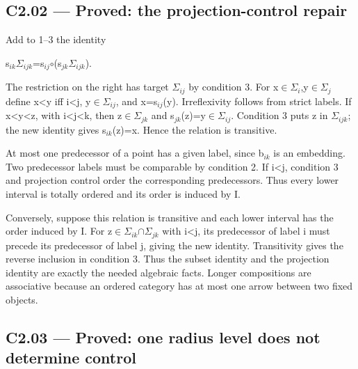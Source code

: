 \subsection{C2.02 --- Proved: the projection-control repair}\label{c2.02-proved-the-projection-control-repair}

Add to 1--3 the identity

s\ensuremath{{}_{ik}}\textbar \ensuremath{\Sigma}\ensuremath{{}_{ijk}}=s\ensuremath{{}_{ij}}\ensuremath{\circ}(s\ensuremath{{}_{jk}}\textbar \ensuremath{\Sigma}\ensuremath{{}_{ijk}}).

The restriction on the right has target \ensuremath{\Sigma}\ensuremath{{}_{ij}} by condition 3. For x\ensuremath{\in}\ensuremath{\Sigma}\ensuremath{{}_{i}},y\ensuremath{\in}\ensuremath{\Sigma}\ensuremath{{}_{j}} define x\textless y iff i\textless j, y\ensuremath{\in}\ensuremath{\Sigma}\ensuremath{{}_{ij}}, and x=s\ensuremath{{}_{ij}}(y). Irreflexivity follows from strict labels. If x\textless y\textless z, with i\textless j\textless k, then z\ensuremath{\in}\ensuremath{\Sigma}\ensuremath{{}_{jk}} and s\ensuremath{{}_{jk}}(z)=y\ensuremath{\in}\ensuremath{\Sigma}\ensuremath{{}_{ij}}. Condition 3 puts z in \ensuremath{\Sigma}\ensuremath{{}_{ijk}}; the new identity gives s\ensuremath{{}_{ik}}(z)=x. Hence the relation is transitive.

At most one predecessor of a point has a given label, since b\ensuremath{{}_{ik}} is an embedding. Two predecessor labels must be comparable by condition 2. If i\textless j, condition 3 and projection control order the corresponding predecessors. Thus every lower interval is totally ordered and its order is induced by I.

Conversely, suppose this relation is transitive and each lower interval has the order induced by I. For z\ensuremath{\in}\ensuremath{\Sigma}\ensuremath{{}_{ik}}\ensuremath{\cap}\ensuremath{\Sigma}\ensuremath{{}_{jk}} with i\textless j, its predecessor of label i must precede its predecessor of label j, giving the new identity. Transitivity gives the reverse inclusion in condition 3. Thus the subset identity and the projection identity are exactly the needed algebraic facts. Longer compositions are associative because an ordered category has at most one arrow between two fixed objects.

\subsection{C2.03 --- Proved: one radius level does not determine control}\label{c2.03-proved-one-radius-level-does-not-determine-control}

